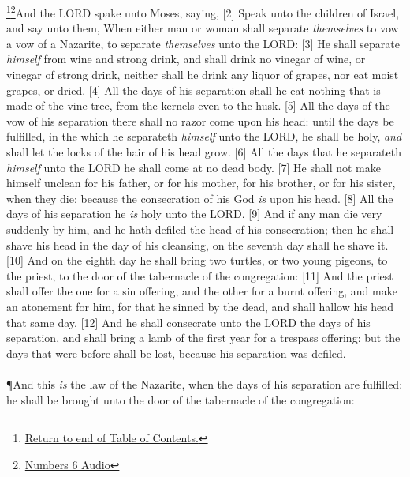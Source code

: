 \footnote{\textcolor[cmyk]{0.99998,1,0,0}{\hyperlink{TOC}{Return to end of Table of Contents.}}}\footnote{\href{https://audiobible.com/bible/numbers_6.html}{\textcolor[cmyk]{0.99998,1,0,0}{Numbers 6 Audio}}}\textcolor[cmyk]{0.99998,1,0,0}{And the LORD spake unto Moses, saying,}
[2] \textcolor[cmyk]{0.99998,1,0,0}{Speak unto the children of Israel, and say unto them, When either man or woman shall separate \emph{themselves} to vow a vow of a Nazarite, to separate \emph{themselves} unto the LORD:}
[3] \textcolor[cmyk]{0.99998,1,0,0}{He shall separate \emph{himself} from wine and strong drink, and shall drink no vinegar of wine, or vinegar of strong drink, neither shall he drink any liquor of grapes, nor eat moist grapes, or dried.}
[4] \textcolor[cmyk]{0.99998,1,0,0}{All the days of his separation shall he eat nothing that is made of the vine tree, from the kernels even to the husk.}
[5] \textcolor[cmyk]{0.99998,1,0,0}{All the days of the vow of his separation there shall no razor come upon his head: until the days be fulfilled, in the which he separateth \emph{himself} unto the LORD, he shall be holy, \emph{and} shall let the locks of the hair of his head grow.}
[6] \textcolor[cmyk]{0.99998,1,0,0}{All the days that he separateth \emph{himself} unto the LORD he shall come at no dead body.}
[7] \textcolor[cmyk]{0.99998,1,0,0}{He shall not make himself unclean for his father, or for his mother, for his brother, or for his sister, when they die: because the consecration of his God \emph{is} upon his head.}
[8] \textcolor[cmyk]{0.99998,1,0,0}{All the days of his separation he \emph{is} holy unto the LORD.}
[9] \textcolor[cmyk]{0.99998,1,0,0}{And if any man die very suddenly by him, and he hath defiled the head of his consecration; then he shall shave his head in the day of his cleansing, on the seventh day shall he shave it.}
[10] \textcolor[cmyk]{0.99998,1,0,0}{And on the eighth day he shall bring two turtles, or two young pigeons, to the priest, to the door of the tabernacle of the congregation:}
[11] \textcolor[cmyk]{0.99998,1,0,0}{And the priest shall offer the one for a sin offering, and the other for a burnt offering, and make an atonement for him, for that he sinned by the dead, and shall hallow his head that same day.}
[12] \textcolor[cmyk]{0.99998,1,0,0}{And he shall consecrate unto the LORD the days of his separation, and shall bring a lamb of the first year for a trespass offering: but the days that were before shall be lost, because his separation was defiled.}\\
\\
\P \textcolor[cmyk]{0.99998,1,0,0}{And this \emph{is} the law of the Nazarite, when the days of his separation are fulfilled: he shall be brought unto the door of the tabernacle of the congregation:}

